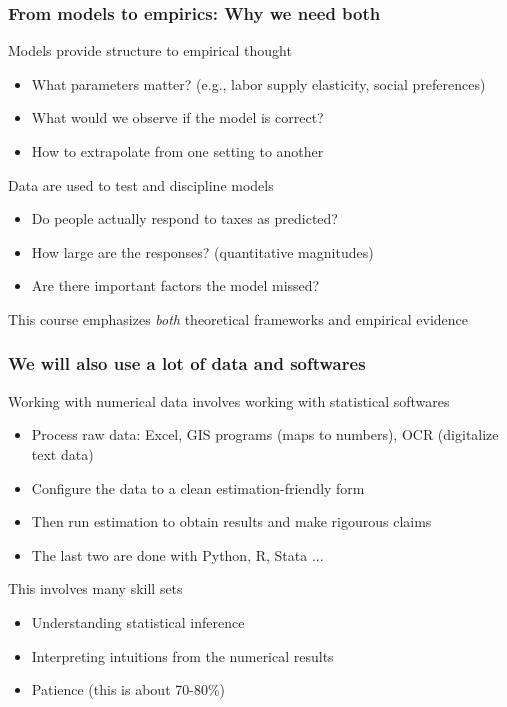\documentclass[aspectratio=169]{beamer}
\begin{document}
\begin{frame}
\frametitle{From models to empirics: Why we need both}
Models provide structure to empirical thought
\begin{itemize}\setlength\itemsep{3pt}
\item What parameters matter? (e.g., labor supply elasticity, social preferences)
\item What would we observe if the model is correct?
\item How to extrapolate from one setting to another
\end{itemize} \medskip

Data are used to test and discipline models
\begin{itemize}\setlength\itemsep{3pt}
\item Do people actually respond to taxes as predicted?
\item How large are the responses? (quantitative magnitudes)
\item Are there important factors the model missed?
\end{itemize} \medskip


This course emphasizes \textit{both} theoretical frameworks and empirical evidence
\end{frame}

\begin{frame}
\frametitle{We will also use a lot of data and softwares} 
 Working with numerical data involves working with statistical softwares
\begin{itemize}\setlength\itemsep{3pt}
\item Process raw data: Excel, GIS programs (maps to numbers), OCR (digitalize text data)
\item Configure the data to a clean estimation-friendly form
\item Then run estimation to obtain results and make rigourous claims
\item The last two are done with Python, R, Stata ...
\end{itemize} \medskip
This involves many skill sets
\begin{itemize}\setlength\itemsep{3pt}
\item Understanding statistical inference
\item Interpreting intuitions from the numerical results
\item Patience (this is about 70-80\%)
\end{itemize} \medskip
\end{frame}
\end{document}
